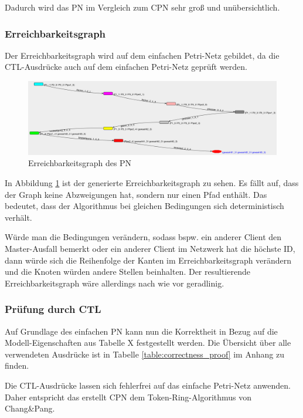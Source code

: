 Dadurch wird das PN im Vergleich zum CPN sehr groß und unübersichtlich.

\subsubsection{Erreichbarkeitsgraph}
Der Erreichbarkeitsgraph wird auf dem einfachen Petri-Netz gebildet, da die CTL-Ausdrücke auch auf dem einfachen Petri-Netz geprüft werden.

\begin{figure}[H]
\centering
\includegraphics[width=1\linewidth]{reachibility_graph}
\caption{Erreichbarkeitsgraph des PN}
\label{fig:reachibility_graph}
\end{figure}

In Abbildung \ref{fig:reachibility_graph} ist der generierte Erreichbarkeitsgraph zu sehen. Es fällt auf, dass der Graph keine Abzweigungen hat, sondern nur einen Pfad enthält. Das bedeutet, dass der Algorithmus bei gleichen Bedingungen sich deterministisch verhält.

Würde man die Bedingungen verändern, sodass bspw. ein anderer Client den Master-Ausfall bemerkt oder ein anderer Client im Netzwerk hat die höchste ID, dann würde sich die Reihenfolge der Kanten im Erreichbarkeitsgraph verändern und die Knoten würden andere Stellen beinhalten. Der resultierende Erreichbarkeitsgraph wäre allerdings nach wie vor geradlinig.

\subsubsection{Prüfung durch CTL}
Auf Grundlage des einfachen PN kann nun die Korrektheit in Bezug auf die Modell-Eigenschaften aus Tabelle X festgestellt werden. Die Übersicht über alle verwendeten Ausdrücke ist in Tabelle \ref{table:correctness_proof} im Anhang zu finden.

Die CTL-Ausdrücke lassen sich fehlerfrei auf das einfache Petri-Netz anwenden. Daher entspricht das erstellt CPN dem Token-Ring-Algorithmus von Chang\&Pang.
